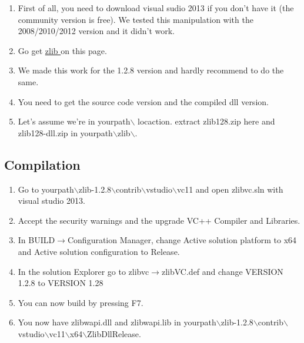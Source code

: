 \documentclass{beamer}
\begin{document}
\begin{frame}
  \begin{enumerate}
    \item First of all, you need to download visual sudio 2013 if you don't have it (the community version is free). We tested this manipulation with the 2008/2010/2012 version and it didn't work.
    \item Go get \color{blue}\href{http://www.zlib.net/}{zlib }\color{black} on this page.
    \item We made this work for the 1.2.8 version and hardly recommend to do the same.
    \item You need to get the source code version and the compiled dll version.
    \item Let's assume we're in yourpath$\backslash$ locaction. extract zlib128.zip here and zlib128-dll.zip in yourpath$\backslash$zlib$\backslash$.
  \end{enumerate}
\end{frame}

\subsection{Compilation}
\begin{frame}
  \begin{enumerate}
    \item Go to yourpath$\backslash$zlib-1.2.8$\backslash$contrib$\backslash$vstudio$\backslash$vc11 and open zlibvc.sln with visual studio 2013.
    \item Accept the security warnings and the upgrade VC++ Compiler and Libraries.
    \item In BUILD$\rightarrow$Configuration Manager, change Active solution platform to x64 and Active solution configuration to Release.
    \item In the solution Explorer go to zlibvc$\rightarrow$zlibVC.def and change VERSION 1.2.8 to VERSION 1.28
    \item You can now build by pressing F7.
    \item You now have zlibwapi.dll and zlibwapi.lib in yourpath$\backslash$zlib-1.2.8$\backslash$contrib$\backslash$vstudio$\backslash$vc11$\backslash$x64$\backslash$ZlibDllRelease.
  \end{enumerate}
\end{frame}
\end{document}
